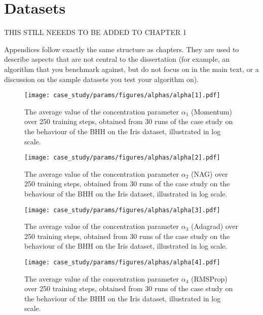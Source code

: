 
\chapter{Datasets}
\label{app:case_study_additional}


THIS STILL NEEEDS TO BE ADDED TO CHAPTER 1

Appendices follow exactly the same structure as chapters. They are used to
describe aspects that are not central to the dissertation (for example, an
algorithm that you benchmark against, but do not focus on in the main text, or a
discussion on the sample datasets you test your algorithm on).



\begin{figure}[htpb]
	\centering
	\texttt{[image: case\_study/params/figures/alphas/alpha[1].pdf]}
	\caption{The average value of the concentration parameter $\alpha_{1}$ (\acs{Momentum}) over 250 training steps, obtained from 30 runs of the case study on the behaviour of the \acs{BHH} on the Iris dataset, illustrated in log scale.}
	\label{fig:app:case_study_additional:alpha:1}
\end{figure}

\begin{figure}[htpb]
	\centering
	\texttt{[image: case\_study/params/figures/alphas/alpha[2].pdf]}
	\caption{The average value of the concentration parameter $\alpha_{2}$ (\acs{NAG}) over 250 training steps, obtained from 30 runs of the case study on the behaviour of the \acs{BHH} on the Iris dataset, illustrated in log scale.}
	\label{fig:app:case_study_additional:alpha:2}
\end{figure}

\begin{figure}[htpb]
	\centering
	\texttt{[image: case\_study/params/figures/alphas/alpha[3].pdf]}
	\caption{The average value of the concentration parameter $\alpha_{3}$ (\acs{Adagrad}) over 250 training steps, obtained from 30 runs of the case study on the behaviour of the \acs{BHH} on the Iris dataset, illustrated in log scale.}
	\label{fig:app:case_study_additional:alpha:3}
\end{figure}

\begin{figure}[htpb]
	\centering
	\texttt{[image: case\_study/params/figures/alphas/alpha[4].pdf]}
	\caption{The average value of the concentration parameter $\alpha_{4}$ (\acs{RMSProp}) over 250 training steps, obtained from 30 runs of the case study on the behaviour of the \acs{BHH} on the Iris dataset, illustrated in log scale.}
	\label{fig:app:case_study_additional:alpha:4}
\end{figure}

